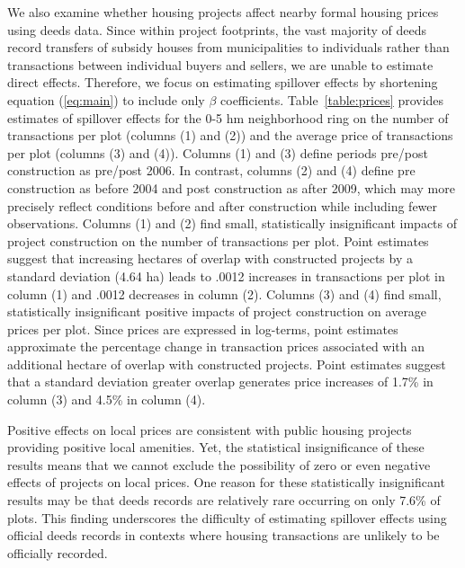 \documentclass[12pt]{article}
\begin{document}
We also examine whether housing projects affect nearby formal housing prices using deeds data.  Since within project footprints, the vast majority of deeds record transfers of subsidy houses from municipalities to individuals rather than transactions between individual buyers and sellers, we are unable to estimate direct effects.  Therefore, we focus on estimating spillover effects by shortening equation (\ref{eq:main}) to include only $\beta$ coefficients.  Table~\ref{table:prices} provides estimates of spillover effects for the 0-5 hm neighborhood ring on the number of transactions per plot (columns (1) and (2)) and the average price of transactions per plot (columns (3) and (4)).  Columns (1) and (3) define periods pre/post construction as pre/post 2006.  In contrast, columns (2) and (4) define pre construction as before 2004 and post construction as after 2009, which may more precisely reflect conditions before and after construction while including fewer observations.  Columns (1) and (2) find small, statistically insignificant impacts of project construction on the number of transactions per plot.  Point estimates suggest that increasing hectares of overlap with constructed projects by a standard deviation (4.64 ha) leads to .0012 increases in transactions per plot in column (1) and .0012 decreases in column (2).  Columns (3) and (4) find small, statistically insignificant positive impacts of project construction on average prices per plot.  Since prices are expressed in log-terms, point estimates approximate the percentage change in transaction prices associated with an additional hectare of overlap with constructed projects.  Point estimates suggest that a standard deviation greater overlap generates price increases of 1.7\% in column (3) and 4.5\% in column (4).  

Positive effects on local prices are consistent with public housing projects providing positive local amenities.  Yet, the statistical insignificance of these results means that we cannot exclude the possibility of zero or even negative effects of projects on local prices.  One reason for these statistically insignificant results may be that deeds records are relatively rare occurring on only 7.6\% of plots.  This finding underscores the difficulty of estimating spillover effects using official deeds records in contexts where housing transactions are unlikely to be officially recorded.
\end{document}
